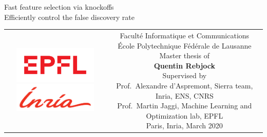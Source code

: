\begin{titlepage}
\begin{center}
\sffamily


\null\vspace{2cm}
{\huge Fast feature selection via knockoffs\\[12pt] Efficiently control the false discovery rate} \\[24pt]

\vfill

\begin{tabular} {cc}
\parbox{0.3\textwidth}{
	\includegraphics[width=4cm]{figures/epfl}
	\includegraphics[width=4cm]{figures/inria_cmjn.pdf}
}
&
\parbox{0.7\textwidth}{%
	Faculté Informatique et Communications\\
	École Polytechnique Fédérale de Lausanne\\
	Master thesis of\\[4pt]
	\null \hspace{3em} \textbf{Quentin Rebjock}\\[9pt]
%
\small
Supervised by\\[4pt]
%
    Prof.\ Alexandre d'Aspremont, Sierra team, Inria, ENS, CNRS\\
    Prof.\ Martin Jaggi, Machine Learning and Optimization lab, EPFL\\[12pt]
%
Paris, Inria, March 2020}
\end{tabular}
\end{center}
\vspace{2cm}
\end{titlepage}
